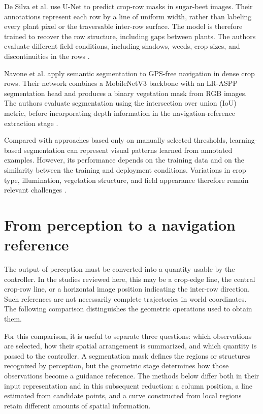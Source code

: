 De Silva et al. use U-Net to predict crop-row masks in sugar-beet images.
Their annotations represent each row by a line of uniform width, rather
than labeling every plant pixel or the traversable inter-row surface.
The model is therefore trained to recover the row structure, including
gaps between plants. The authors evaluate different field conditions,
including shadows, weeds, crop sizes, and discontinuities in the rows
\cite[Sections~3.3 and~4.1]{silva2023rowdetection}.

Navone et al. apply semantic segmentation to GPS-free navigation in
dense crop rows. Their network combines a MobileNetV3 backbone with an
LR-ASPP segmentation head and produces a binary vegetation mask from
RGB images. The authors evaluate segmentation using the intersection
over union (IoU) metric, before incorporating depth information in the
navigation-reference extraction stage
\cite[Sections~3.3 and~4.1]{navone2025gpsfree}.

Compared with approaches based only on manually selected thresholds,
learning-based segmentation can represent visual patterns learned from
annotated examples. However, its performance depends on the training
data and on the similarity between the training and deployment
conditions. Variations in crop type, illumination, vegetation structure,
and field appearance therefore remain relevant challenges
\cite[Sections~2.2 and~3]{silva2023rowdetection}.


\section{From perception to a navigation reference}
\label{sec:estrazione_traiettoria}

The output of perception must be converted into a quantity usable by the
controller. In the studies reviewed here, this may be a crop-edge line,
the central crop-row line, or a horizontal image position indicating the
inter-row direction. Such references are not necessarily complete
trajectories in world coordinates. The following comparison distinguishes
the geometric operations used to obtain them.

For this comparison, it is useful to separate three questions: which
observations are selected, how their spatial arrangement is summarized,
and which quantity is passed to the controller. A segmentation mask
defines the regions or structures recognized by perception, but the
geometric stage determines how those observations become a guidance
reference. The methods below differ both in their input representation
and in this subsequent reduction: a column position, a line estimated
from candidate points, and a curve constructed from local regions retain
different amounts of spatial information.

